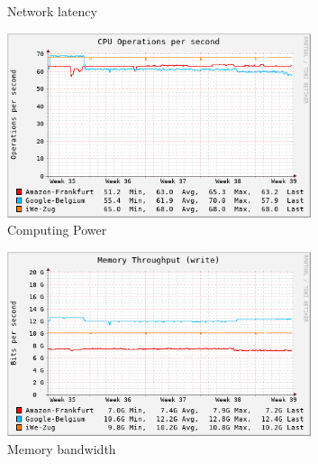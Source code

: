 \begin{figure}
\begin{subfigure}{.5\textwidth}
  \vspace{-0.05in}
  \caption{Network latency}
  \vspace{0.1in}
  \label{fig:sub3}
\end{subfigure}%
\begin{subfigure}{.5\textwidth}
  \centering
  \includegraphics[width=0.98\textwidth]{30d-perf/cpu_ops-month}
  \vspace{-0.05in}
  \caption{Computing Power}
  \vspace{0.1in}
  \label{fig:sub4}
\end{subfigure}
\begin{subfigure}{.5\textwidth}
  \centering
  \includegraphics[width=0.98\textwidth]{30d-perf/mem_write-month}
  \vspace{-0.05in}
  \caption{Memory bandwidth}
  \vspace{0.1in}
  \label{fig:sub5}
\end{subfigure}%
\begin{subfigure}{.5\textwidth}
  \centering

\end{subfigure}
\end{figure}

